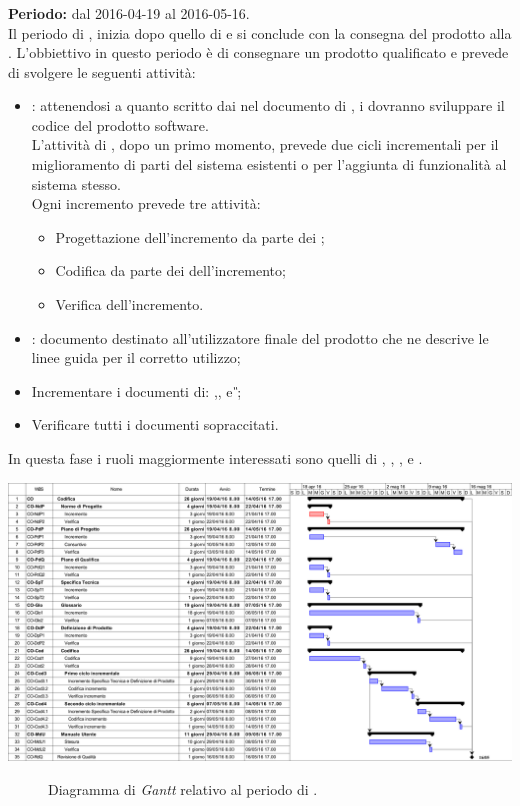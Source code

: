 \subsubsection{\CO}
\textbf{Periodo:} dal 2016-04-19 al 2016-05-16. \\
Il periodo di \CO, inizia dopo quello di \PD  e si conclude con la consegna del prodotto alla \RQ. L'obbiettivo in questo periodo è di consegnare un prodotto qualificato e prevede di svolgere le seguenti attività:
\begin{itemize}
	\item \textbf{\CO}: attenendosi a quanto scritto dai \textit{\Progs} nel documento di \textit{\DDP}, i \textit{\Progrs} dovranno sviluppare il codice del prodotto software.\\
	L'attività di \CO, dopo un primo momento, prevede due cicli incrementali per il miglioramento di parti del sistema esistenti o per l'aggiunta di funzionalità al sistema stesso. \\
	Ogni incremento prevede tre attività:
	\begin{itemize}
		\item Progettazione dell'incremento da parte dei \textit{\Progs};  
		\item Codifica da parte dei \textit{\Progrs} dell'incremento;
		\item Verifica dell'incremento. 
	\end{itemize}
	\item \textit{\MU}: documento destinato all'utilizzatore finale del prodotto che ne descrive le linee guida per il corretto utilizzo;
	\item Incrementare i documenti di: \textit{\NdP},\textit{\PdP}, \textit{\PdQ} e \textit{\G};
	\item Verificare tutti i documenti sopraccitati.
\end{itemize}
In questa fase i ruoli maggiormente interessati sono quelli di \textit{\Amm}, \textit{\Res}, \textit{\Prog}, \textit{\Progr} e \textit{\Ver}. 
\begin{center}
	\includegraphics[keepaspectratio = true, width=16cm]{immagini/PdP_CodificaGantt.png}
\end{center}
\begin{figure}[h]
	\caption{Diagramma di \textit{Gantt} relativo al periodo di \CO.}\label{etichetta}
\end{figure}

